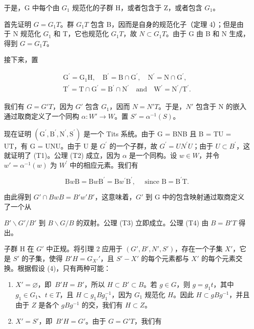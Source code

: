 于是，G 中每个由 \(G_{1}\) 规范化的子群 H，或者包含于 Z，或者包含 \(G_{1}\)。

首先证明 \(G = G_{1}T\)。群 \(G_{1}T\) 包含 B，因而是自身的规范化子（定理 4）；但是由于 N 规范化 \(G_{1}\) 和 T，它也规范化 \(G_{1}T\)，故 \(N \subset G_{1}T\)。由于 G 由 B 和 N 生成，得到 \(G = G_{1}T\)。

接下来，置

\[
\begin{array}{c} \mathrm{G} ^ {\prime} = \mathrm{G} _ {1} \mathrm{H}, \quad \mathrm{B} ^ {\prime} = \mathrm{B} \cap \mathrm{G} ^ {\prime}, \quad \mathrm{N} ^ {\prime} = \mathrm{N} \cap \mathrm{G} ^ {\prime}, \\ \mathrm{T} ^ {\prime} = \mathrm{T} \cap \mathrm{G} ^ {\prime} = \mathrm{B} ^ {\prime} \cap \mathrm{N} ^ {\prime} \quad \text {and} \quad \mathrm{W} ^ {\prime} = \mathrm{N} ^ {\prime} / \mathrm{T} ^ {\prime}. \end{array}
\]

我们有 \(G = G'T\)，因为 \(G'\) 包含 \(G_{1}\)，因而 \(N = N'T\)。于是，\(N'\) 包含于 N 的嵌入通过取商定义了一个同构 \(\alpha : W' \to W\)。置 \(S' = \alpha^{-1}(S)\)。

现在证明 \((\mathrm{G}^{\prime},\mathrm{B}^{\prime},\mathrm{N}^{\prime},\mathrm{S}^{\prime})\) 是一个 Tits 系统。由于 G = BNB 且 B = TU = UT，有 G = UNU。由于 U 是 \(G^{\prime}\) 的一个子群，故 \(G^{\prime} = UN^{\prime}U\)；由于 \(U \subset B^{\prime}\)，这就证明了 (T1)。公理 (T2) 成立，因为 \(\alpha\) 是一个同构。设 \(w \in W\)，并令 \(w' = \alpha^{-1}(w)\) 为 \(W^{\prime}\) 中的相应元素。我们有

\[
\mathrm{B} w \mathrm{B} = \mathrm{B} w \mathrm{B} ^ {\prime} = \mathrm{B} w ^ {\prime} \mathrm{B} ^ {\prime}, \quad \text { since } \mathrm{B} = \mathrm{B} ^ {\prime} \mathrm{T}.
\]

由此得到 \(G' \cap BwB = B'w'B'\)，这意味着，\(G'\) 到 G 中的包含映射通过取商定义了一个从

\(B'\backslash G'/B'\) 到 \(B\backslash G/B\) 的双射。公理 (T3) 立即成立。公理 (T4) 由 \(B = B'T\) 得出。

子群 H 在 \(G'\) 中正规。将引理 2 应用于 \((G', B', N', S')\)，存在一个子集 \(X'\)，它是 \(S'\) 的子集，使得 \(B'H = G_{X'}'\)，且 \(S' - X'\) 的每个元素都与 \(X'\) 的每个元素交换。根据假设 (4)，只有两种可能：

\begin{enumerate}
\def\labelenumi{\alph{enumi})}
\item
  \(X' = \varnothing\)，即~\(B'H = B'\)，所以 \(H \subset B' \subset B\)。若 \(g \in G\)，则 \(g = g_1 t\)，其中 \(g_1 \in G_1\)、\(t \in T\)，且 \(H \subset g_1 Bg_1^{-1}\)，因为 \(G_1\) 规范化 \(H\)。因此 \(H \subset gBg^{-1}\)，并且由于 \(Z\) 是各个 \(gBg^{-1}\) 的交，我们有 \(H \subset Z\)。
\item
  \(X' = S'\)，即~\(B'H = G'\)。由于 \(G = G'T\)，我们有
\end{enumerate}

